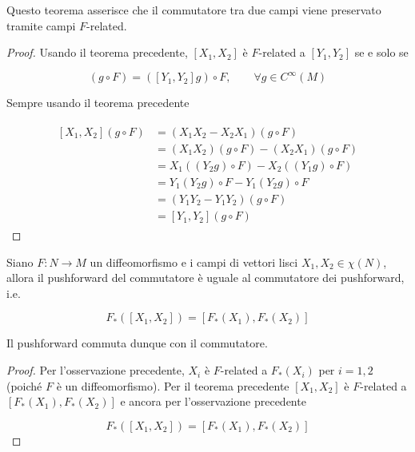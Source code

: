 Questo teorema asserisce che il commutatore tra due campi viene preservato tramite campi $ F $-related.

\begin{proof}
	Usando il teorema precedente, $ [X_{1},X_{2}] $ è $ F $-related a $ [Y_{1},Y_{2}] $ se e solo se
	
	\begin{equation}
		[X_{1},X_{2}](g \circ F) = ([Y_{1},Y_{2}] g) \circ F, \qquad \forall g \in C^{\infty}(M)
	\end{equation}

	Sempre usando il teorema precedente
	
	\begin{align}
		\begin{split}
			[X_{1},X_{2}](g \circ F) &= (X_{1} X_{2} - X_{2} X_{1})(g \circ F)\\
			&= (X_{1} X_{2})(g \circ F) - (X_{2} X_{1})(g \circ F)\\
			&= X_{1}((Y_{2} g) \circ F) - X_{2}((Y_{1} g) \circ F)\\
			&= Y_{1}(Y_{2} g) \circ F - Y_{1}(Y_{2} g) \circ F\\
			&= (Y_{1} Y_{2} - Y_{1} Y_{2})(g \circ F)\\
			&= [Y_{1},Y_{2}](g \circ F)
		\end{split}
	\end{align}
\end{proof}

\begin{corollary}
	Siano $ F : N \to M $ un diffeomorfismo e i campi di vettori lisci $ X_{1},X_{2} \in \chi(N) $, allora il pushforward del commutatore è uguale al commutatore dei pushforward, i.e.
	
	\begin{equation}
		F_{*} ([X_{1},X_{2}]) = [F_{*} (X_{1}),F_{*} (X_{2})]
	\end{equation}

	Il pushforward commuta dunque con il commutatore.
\end{corollary}

\begin{proof}
	Per l'osservazione precedente, $ X_{i} $ è $ F $-related a $ F_{*}(X_{i}) $ per $ i=1,2 $ (poiché $ F $ è un diffeomorfismo). Per il teorema precedente $ [X_{1},X_{2}] $ è $ F $-related a $ [F_{*} (X_{1}),F_{*} (X_{2})] $ e ancora per l'osservazione precedente
	
	\begin{equation}
		F_{*} ([X_{1},X_{2}]) = [F_{*} (X_{1}),F_{*} (X_{2})]
	\end{equation}
\end{proof}


























